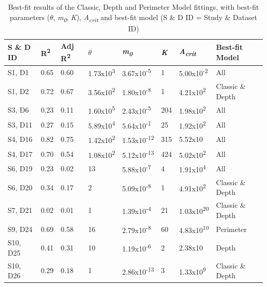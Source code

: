 \begin{table}[h]
    \caption{Best-fit results of the Classic, Depth and Perimeter Model fittings, with best-fit parameters ($\theta$, \textit{m\textsubscript{0}}, \textit{K}), \textit{A\textsubscript{crit}} and best-fit model (S \& D ID = Study \& Dataset ID)}
    \label{crouch}
    \begin{tabular}{  l  p{1cm}  p{1cm} p{1.5cm} p{1.5cm} p{1.5cm} p{1.5cm} p{1.5cm}}
        \toprule
\textbf{S \& D ID} 
&R\textsuperscript{2}
& Adj R\textsuperscript{2}
& $\theta$
& \textit{m\textsubscript{0}}
& \textit{K}
& \textit{A\textsubscript{crit}}
& Best-fit Model\\\midrule
S1, D1
& 0.65
& 0.60
& 1.73x10\textsuperscript{3}
& 3.67x10\textsuperscript{-5}
& 1
& 5.00x10\textsuperscript{-2}
& All \\\hline
S1, D2
& 0.72
& 0.67
& 3.56x10\textsuperscript{2}
& 1.80x10\textsuperscript{-8}
& 1
& 4.21x10\textsuperscript{2}
&Classic \& Depth \\\hline
S3, D6
& 0.23
& 0.11
& 1.60x10\textsuperscript{5}
& 2.43x10\textsuperscript{-5}
& 204
& 1.98x10\textsuperscript{2}
& All \\\hline
S3, D11
& 0.27
& 0.15
& 5.89x10\textsuperscript{4}
& 5.64x10\textsuperscript{-1}
& 25
& 1.92x10\textsuperscript{2}
& All \\\hline
S4, D16
& 0.82
& 0.75
& 1.42x10\textsuperscript{2}
& 1.53x10\textsuperscript{-12}
& 315
& 5.52x10
&  All \\\hline
S4, D17
& 0.70
& 0.54
& 1.08x10\textsuperscript{2}
& 5.12x10\textsuperscript{-13}
& 424
& 5.02x10\textsuperscript{2}
&  All \\\hline
S6, D19 
& 0.23
& 0.02
& 13
& 5.88x10\textsuperscript{-7}
& 4
& 1.91x10\textsuperscript{4}
& All \\\hline
S6, D20
& 0.34
& 0.17
& 2
& 5.09x10\textsuperscript{-8}
& 1
& 4.91x10\textsuperscript{2}
&  Classic \& Depth \\\hline
S7, D21
& 0.02
& 0.01
& 1
& 1.39x10\textsuperscript{-4}
& 21
& 1.03x10\textsuperscript{20}
& Classic \& Depth \\\hline
S9, D24
& 0.69
& 0.58
& 16
& 2.79x10\textsuperscript{-8}
& 60
& 4.83x10\textsuperscript{10}
& Perimeter \\\hline
S10, D25
& 0.41
& 0.31
& 10
& 1.19x10\textsuperscript{-6}
& 2
& 2.38x10
& Depth \\\hline
S10, D26  
& 0.29
& 0.18
& 1
& 2.86x10\textsuperscript{-13}
& 3
& 1.33x10\textsuperscript{9}
& Classic \& Depth \\\hline

\end{tabular}
\end{table}
